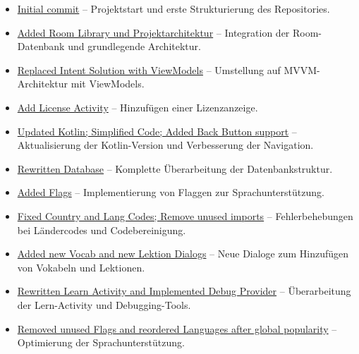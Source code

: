 \documentclass[12pt,a4paper]{article}
\begin{document}
\begin{itemize}
    \item \href{https://github.com/Erik-Donath/Palabra/commit/864ebf0f71aac98fae10cba9fc118028a1333fd8}{Initial commit} -- Projektstart und erste Strukturierung des Repositories.
    \item \href{https://github.com/Erik-Donath/Palabra/commit/13b34d5efca6c7f2dcc97147ada92919e193a322}{Added Room Library und Projektarchitektur} -- Integration der Room-Datenbank und grundlegende Architektur.
    \item \href{https://github.com/Erik-Donath/Palabra/commit/0d82f5896756da601495fac90b8f8a05eca06a81}{Replaced Intent Solution with ViewModels} -- Umstellung auf MVVM-Architektur mit ViewModels.
    \item \href{https://github.com/Erik-Donath/Palabra/commit/11be0359de673b3c92dd18909bb47f754bcf3040}{Add License Activity} -- Hinzufügen einer Lizenzanzeige.
    \item \href{https://github.com/Erik-Donath/Palabra/commit/507cadc495cdee66976928d968aa23b10c6f086d}{Updated Kotlin; Simplified Code; Added Back Button support} -- Aktualisierung der Kotlin-Version und Verbesserung der Navigation.
    \item \href{https://github.com/Erik-Donath/Palabra/commit/c65171940fad9fe11f5604990ea31395d8c1b829}{Rewritten Database} -- Komplette Überarbeitung der Datenbankstruktur.
    \item \href{https://github.com/Erik-Donath/Palabra/commit/56ce6556d47316994946e8291166b68bd2bec3f9}{Added Flags} -- Implementierung von Flaggen zur Sprachunterstützung.
    \item \href{https://github.com/Erik-Donath/Palabra/commit/bc822c0f34fbeec6566a5ba35a1defa666dad456}{Fixed Country and Lang Codes; Remove unused imports} -- Fehlerbehebungen bei Ländercodes und Codebereinigung.
    \item \href{https://github.com/Erik-Donath/Palabra/commit/a31289a9ef71628d3ffa6170a53dae528de9d0e5}{Added new Vocab and new Lektion Dialogs} -- Neue Dialoge zum Hinzufügen von Vokabeln und Lektionen.
    \item \href{https://github.com/Erik-Donath/Palabra/commit/a846ee02333d85817c9655c5fd34cc9a7acabd9d}{Rewritten Learn Activity and Implemented Debug Provider} -- Überarbeitung der Lern-Activity und Debugging-Tools.
    \item \href{https://github.com/Erik-Donath/Palabra/commit/bd11641738224ec701efae7cd1243153af7b10fe}{Removed unused Flags and reordered Languages after global popularity} -- Optimierung der Sprachunterstützung.

\end{itemize}
\end{document}
